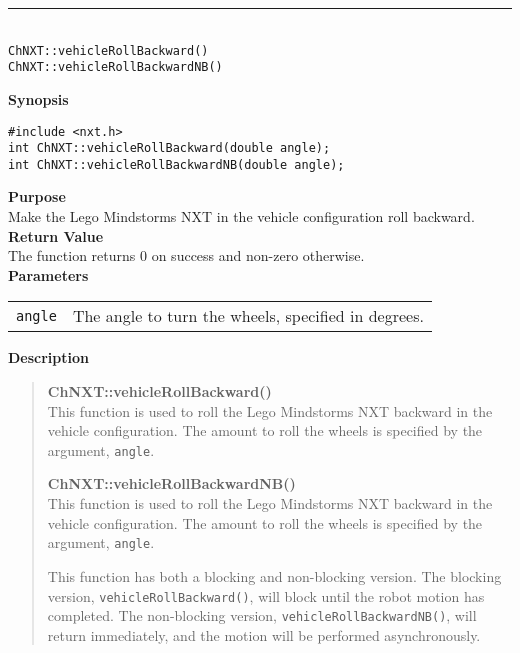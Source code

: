 \noindent
\vspace{5pt}
\rule{4.5in}{0.015in}\\
\noindent
{\LARGE \texttt{ChNXT::vehicleRollBackward()}}\\
{\LARGE \texttt{ChNXT::vehicleRollBackwardNB()}}\\
{}

\noindent
{\bf Synopsis}
\vspace{-8pt}
\begin{verbatim}
#include <nxt.h>
int ChNXT::vehicleRollBackward(double angle);
int ChNXT::vehicleRollBackwardNB(double angle);
\end{verbatim}

\noindent
{\bf Purpose}\\
Make the Lego Mindstorms NXT in the vehicle configuration roll backward.\\

\noindent
{\bf Return Value}\\
The function returns 0 on success and non-zero otherwise.\\

\noindent
{\bf Parameters}\\
\vspace{-0.1in}
\begin{description}
\item               
\begin{tabular}{p{15 mm}p{145 mm}}
\texttt{angle} & The angle to turn the wheels, specified in degrees.\\
\end{tabular}
\end{description}

\noindent
{\bf Description}\\
\vspace{-12pt}
\begin{quote}
{\bf ChNXT::vehicleRollBackward()}\\
This function is used to roll the Lego Mindstorms NXT backward in the vehicle
configuration. The amount to roll the wheels is specified by the argument,
\texttt{angle}.

{\bf ChNXT::vehicleRollBackwardNB()}\\
This function is used to roll the Lego Mindstorms NXT backward in the vehicle
configuration. The amount to roll the wheels is specified by the argument,
\texttt{angle}.

This function has both a blocking and non-blocking version.
The blocking version, \texttt{vehicleRollBackward()}, will block until the
robot motion has completed. The non-blocking version, \texttt{vehicleRollBackwardNB()},
will return immediately, and the motion will be performed asynchronously.\\
\end{quote}

